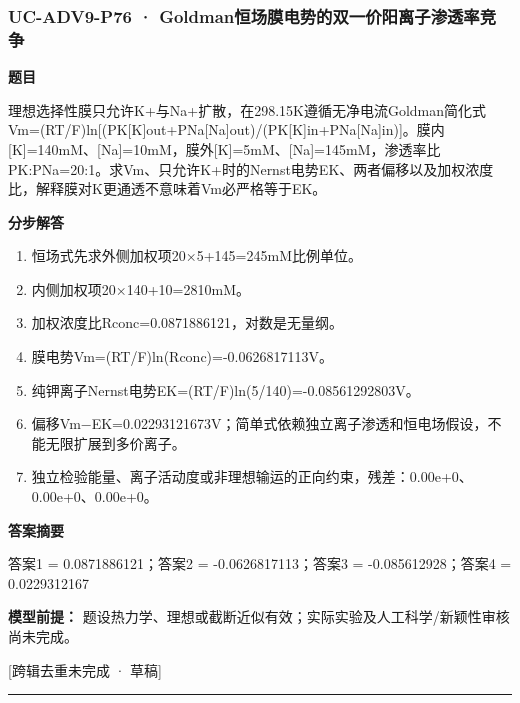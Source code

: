 \documentclass[UTF8,11pt,a4paper]{ctexart}
\begin{document}
\subsubsection*{UC-ADV9-P76 · Goldman恒场膜电势的双一价阳离子渗透率竞争}
\noindent\textbf{题目}\par
理想选择性膜只允许K+与Na+扩散，在298.15K遵循无净电流Goldman简化式Vm=(RT/F)ln[(PK[K]out+PNa[Na]out)/(PK[K]in+PNa[Na]in)]。膜内[K]=140mM、[Na]=10mM，膜外[K]=5mM、[Na]=145mM，渗透率比PK:PNa=20:1。求Vm、只允许K+时的Nernst电势EK、两者偏移以及加权浓度比，解释膜对K更通透不意味着Vm必严格等于EK。\par
\medskip\noindent\textbf{分步解答}
\begin{enumerate}
\item 恒场式先求外侧加权项20×5+145=245mM比例单位。
\item 内侧加权项20×140+10=2810mM。
\item 加权浓度比Rconc=0.0871886121，对数是无量纲。
\item 膜电势Vm=(RT/F)ln(Rconc)=-0.0626817113V。
\item 纯钾离子Nernst电势EK=(RT/F)ln(5/140)=-0.08561292803V。
\item 偏移Vm−EK=0.02293121673V；简单式依赖独立离子渗透和恒电场假设，不能无限扩展到多价离子。
\item 独立检验能量、离子活动度或非理想输运的正向约束，残差：0.00e+0、0.00e+0、0.00e+0。
\end{enumerate}
\noindent\textbf{答案摘要}\par
答案1 = 0.0871886121；答案2 = -0.0626817113；答案3 = -0.085612928；答案4 = 0.0229312167\par
\noindent\textbf{模型前提：}
题设热力学、理想或截断近似有效；实际实验及人工科学/新颖性审核尚未完成。\par
\noindent\textcolor{red!65!black}{[跨辑去重未完成 · 草稿]} \par
\medskip\hrule\medskip
{}
\end{document}
